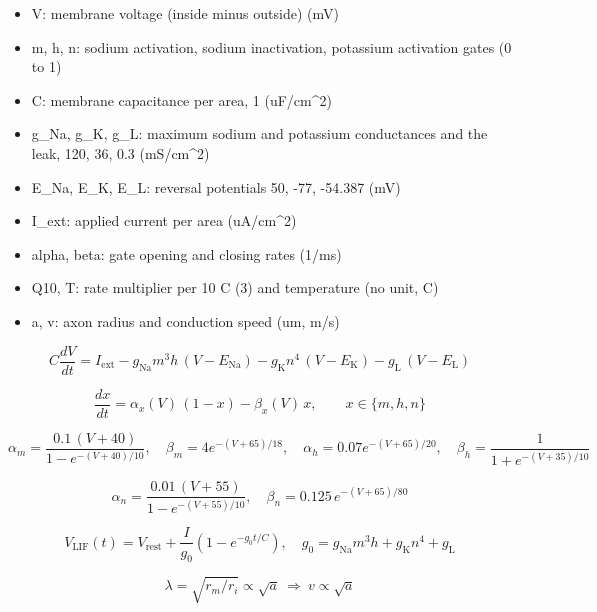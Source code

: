\documentclass[11pt,a4paper]{article}
\begin{document}
\begin{itemize}[nosep]
\item V: membrane voltage (inside minus outside) (mV)
\item m, h, n: sodium activation, sodium inactivation, potassium activation gates (0 to 1)
\item C: membrane capacitance per area, 1 (uF/cm\textasciicircum{}2)
\item g\_Na, g\_K, g\_L: maximum sodium and potassium conductances and the leak, 120, 36, 0.3 (mS/cm\textasciicircum{}2)
\item E\_Na, E\_K, E\_L: reversal potentials 50, -77, -54.387 (mV)
\item I\_ext: applied current per area (uA/cm\textasciicircum{}2)
\item alpha, beta: gate opening and closing rates (1/ms)
\item Q10, T: rate multiplier per 10 C (3) and temperature (no unit, C)
\item a, v: axon radius and conduction speed (um, m/s)
\end{itemize}

\begin{equation*}
C\frac{dV}{dt}=I_{\mathrm{ext}}-g_{\mathrm{Na}}m^3h\,(V-E_{\mathrm{Na}})-g_{\mathrm{K}}n^4\,(V-E_{\mathrm{K}})-g_{\mathrm{L}}\,(V-E_{\mathrm{L}})
\end{equation*}

\begin{equation*}
\frac{dx}{dt}=\alpha_x(V)\,(1-x)-\beta_x(V)\,x,\qquad x\in\{m,h,n\}
\end{equation*}

\begin{equation*}
\alpha_m=\frac{0.1\,(V+40)}{1-e^{-(V+40)/10}},\quad \beta_m=4e^{-(V+65)/18},\quad \alpha_h=0.07e^{-(V+65)/20},\quad \beta_h=\frac{1}{1+e^{-(V+35)/10}}
\end{equation*}

\begin{equation*}
\alpha_n=\frac{0.01\,(V+55)}{1-e^{-(V+55)/10}},\quad \beta_n=0.125\,e^{-(V+65)/80}
\end{equation*}

\begin{equation*}
V_{\mathrm{LIF}}(t)=V_{\mathrm{rest}}+\frac{I}{g_0}\left(1-e^{-g_0t/C}\right),\quad g_0=g_{\mathrm{Na}}m^3h+g_{\mathrm{K}}n^4+g_{\mathrm{L}}
\end{equation*}

\begin{equation*}
\lambda=\sqrt{r_m/r_i}\propto\sqrt{a}\ \Rightarrow\ v\propto\sqrt{a}
\end{equation*}
\end{document}
